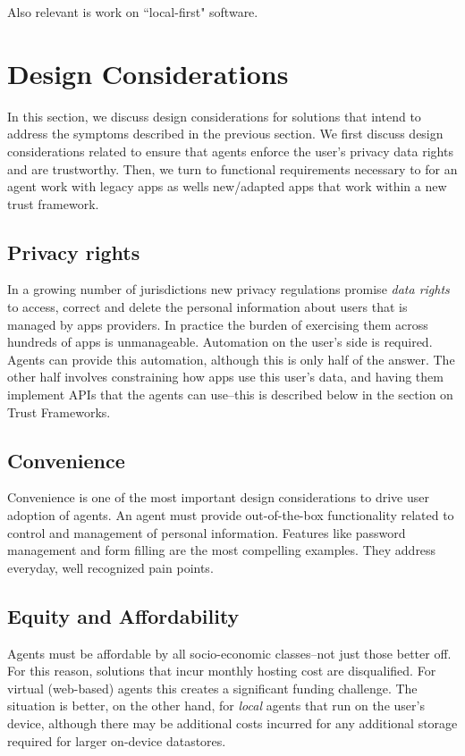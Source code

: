 \documentclass[11pt, oneside]{article}   	%
\begin{document}
Also relevant is work on ``local-first" software.\cite{Kleppmann2019}

\section{Design Considerations} %

In this section, we discuss design considerations for solutions that intend to address the symptoms described in the previous section. We first discuss design considerations related to ensure that agents enforce the user's privacy data rights and are trustworthy. Then, we turn to functional requirements necessary to for an agent work with legacy apps as wells new/adapted apps that work within a new trust framework.

\subsection{Privacy rights}

In a growing number of jurisdictions new privacy regulations promise \emph{data rights} to access, correct and delete the personal information about users that is managed by apps providers. In practice the burden of exercising them across hundreds of apps is unmanageable. Automation on the user's side is required. Agents can provide this automation, although this is only half of the answer. The other half involves constraining how apps use this user's data, and having them implement APIs that the agents can use--this is described below in the section on Trust Frameworks.

\subsection{Convenience}

Convenience is one of the most important design considerations to drive user adoption of agents. An agent must provide out-of-the-box functionality related to control and management of personal information. Features like password management and form filling are the most compelling examples. They address everyday, well recognized pain points. 

\subsection{Equity and Affordability}

Agents must be affordable by all socio-economic classes--not just those better off. For this reason, solutions that incur monthly hosting cost are disqualified. For virtual (web-based) agents this creates a significant funding challenge. The situation is better, on the other hand, for \emph{local} agents that run on the user's device, although there may be additional costs incurred for any additional storage required for larger on-device datastores.
\end{document}
